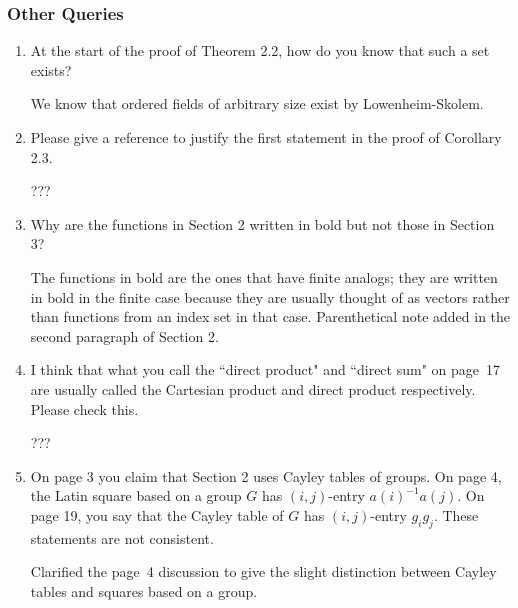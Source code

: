 \documentclass[12pt,a4paper]{article}
\newenvironment{QandA}{\begin{enumerate}[label=\bfseries\alph*.]\bfseries}
                      {\end{enumerate}}
\newenvironment{answered}{\par\normalfont}{}
\begin{document}
\subsubsection*{Other Queries}

\begin{QandA}

\item At the start of the proof of Theorem 2.2, how do you know that such a set exists? %

\begin{answered}
We know that ordered fields of arbitrary size exist by Lowenheim-Skolem. 
\end{answered}

\item Please give a reference to justify the first statement in the proof of Corollary 2.3.

\begin{answered}
???
\end{answered}

\item Why are the functions in Section 2 written in bold but not those in Section 3?

\begin{answered}
The functions in bold are the ones that have finite analogs; they are written in bold in the finite case because they are usually thought of as vectors rather than functions from an index set in that case.  Parenthetical note added in the second paragraph of Section 2.
\end{answered}

\item I think that what you call the ``direct product" and ``direct sum" on page~17 are usually called the Cartesian product and direct product respectively. Please check this.

\begin{answered}
???
\end{answered}



\item On page 3 you claim that Section 2 uses Cayley tables of groups. On page 4, the Latin square based on a group $G$ has $(i,j)$-entry $a(i)^{-1} a(j)$. On page 19, you say that the Cayley table of $G$ has $(i,j)$-entry $g_ig_j$. These statements are not consistent.

\begin{answered}
Clarified the page~4 discussion to give the slight distinction between Cayley tables and squares based on a group.  
\end{answered}



\end{QandA}
\end{document}
